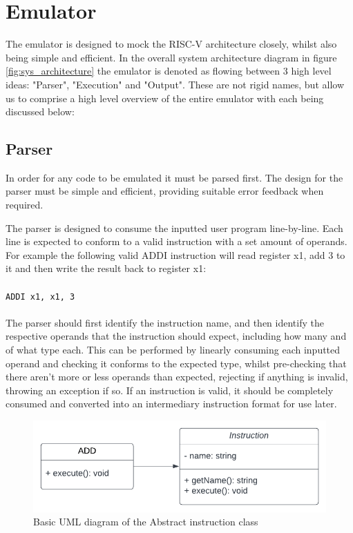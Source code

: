 \section{Emulator}\label{sec:emulator}
The emulator is designed to mock the RISC-V architecture closely, whilst also being simple and efficient. In the overall system architecture diagram in figure \ref{fig:sys_architecture} the emulator is denoted as flowing between 3 high level ideas: "Parser", "Execution" and "Output". These are not rigid names, but allow us to comprise a high level overview of the entire emulator with each being discussed below:

\subsection{Parser}\label{sec:parser}
In order for any code to be emulated it must be parsed first. The design for the parser must be simple and efficient, providing suitable error feedback when required.

The parser is designed to consume the inputted user program line-by-line. Each line is expected to conform to a valid instruction with a set amount of operands. For example the following valid ADDI instruction will read register x1, add 3 to it and then write the result back to register x1:\\\\
\verb|ADDI x1, x1, 3|
\\\\
The parser should first identify the instruction name, and then identify the respective operands that the instruction should expect, including how many and of what type each. This can be performed by linearly consuming each inputted operand and checking it conforms to the expected type, whilst pre-checking that there aren't more or less operands than expected, rejecting if anything is invalid, throwing an exception if so. If an instruction is valid, it should be completely consumed and converted into an intermediary instruction format for use later.

\begin{figure}[H]
    \centering
    \includegraphics[width=0.95\linewidth]{dissertation/DATA/instr_abstract_uml.png}
    \caption{Basic UML diagram of the Abstract instruction class}
    \label{fig:instr_abstract_uml}
\end{figure}

